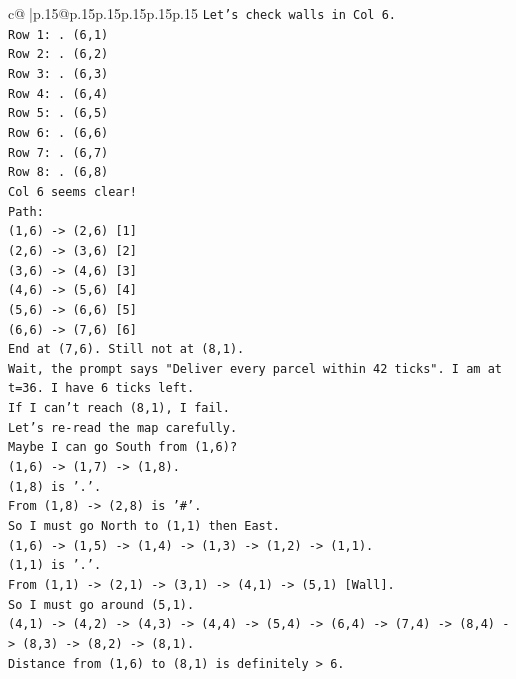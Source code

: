 \documentclass{article}
\begin{document}
{\begin{supertabular}{c@{$\;$}|p{.15\linewidth}@{}p{.15\linewidth}p{.15\linewidth}p{.15\linewidth}p{.15\linewidth}p{.15\linewidth}}
{{{\texttt{Let's check walls in Col 6.} \\
\texttt{Row 1: . (6,1)} \\
\texttt{Row 2: . (6,2)} \\
\texttt{Row 3: . (6,3)} \\
\texttt{Row 4: . (6,4)} \\
\texttt{Row 5: . (6,5)} \\
\texttt{Row 6: . (6,6)} \\
\texttt{Row 7: . (6,7)} \\
\texttt{Row 8: . (6,8)} \\
\texttt{Col 6 seems clear!} \\
\texttt{Path:} \\
\texttt{(1,6) {-}> (2,6) {[}1{]}} \\
\texttt{(2,6) {-}> (3,6) {[}2{]}} \\
\texttt{(3,6) {-}> (4,6) {[}3{]}} \\
\texttt{(4,6) {-}> (5,6) {[}4{]}} \\
\texttt{(5,6) {-}> (6,6) {[}5{]}} \\
\texttt{(6,6) {-}> (7,6) {[}6{]}} \\
\texttt{End at (7,6). Still not at (8,1).} \\
\texttt{Wait, the prompt says "Deliver every parcel within 42 ticks". I am at t=36. I have 6 ticks left.} \\
\texttt{If I can't reach (8,1), I fail.} \\
\texttt{Let's re{-}read the map carefully.} \\
\texttt{Maybe I can go South from (1,6)?} \\
\texttt{(1,6) {-}> (1,7) {-}> (1,8).} \\
\texttt{(1,8) is '.'.} \\
\texttt{From (1,8) {-}> (2,8) is '\#'.} \\
\texttt{So I must go North to (1,1) then East.} \\
\texttt{(1,6) {-}> (1,5) {-}> (1,4) {-}> (1,3) {-}> (1,2) {-}> (1,1).} \\
\texttt{(1,1) is '.'.} \\
\texttt{From (1,1) {-}> (2,1) {-}> (3,1) {-}> (4,1) {-}> (5,1) {[}Wall{]}.} \\
\texttt{So I must go around (5,1).} \\
\texttt{(4,1) {-}> (4,2) {-}> (4,3) {-}> (4,4) {-}> (5,4) {-}> (6,4) {-}> (7,4) {-}> (8,4) {-}> (8,3) {-}> (8,2) {-}> (8,1).} \\
\texttt{Distance from (1,6) to (8,1) is definitely > 6.} \\
}}}
\end{supertabular}}
\end{document}
